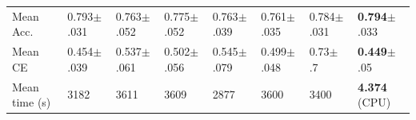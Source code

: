 \begin{tabular}{llllllll}
\midrule
Mean Acc.                        &  0.793$\pm$.031 &  0.763$\pm$.052 &   0.775$\pm$.052 &    0.763$\pm$.039 &  0.761$\pm$.035 &  0.784$\pm$.031 &  \textbf{0.794}$\pm$.033 \\
Mean CE                          &  0.454$\pm$.039 &  0.537$\pm$.061 &   0.502$\pm$.056 &    0.545$\pm$.079 &  0.499$\pm$.048 &     0.73$\pm$.7 &   \textbf{0.449}$\pm$.05 \\
\midrule
Mean time (s) 
                                                &            3182 &            3611 &             3609 &              2877 &            3600 &            3400 &           \textbf{4.374} (CPU) \\
\bottomrule
\end{tabular}